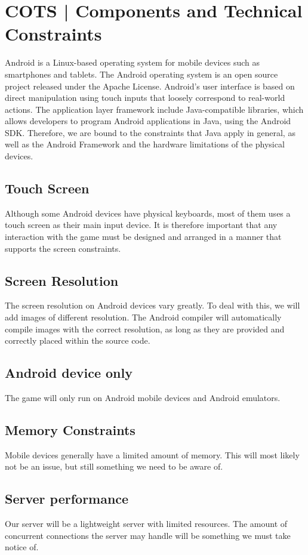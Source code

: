 \section{COTS | Components and Technical Constraints}
\label{sec:COTS}
Android is a Linux-based operating system for mobile devices such as
smartphones and tablets. The Android operating system is an open source project released under the Apache License. Android's user interface is based on direct manipulation using touch inputs that loosely correspond to real-world actions. The application layer framework include
Java-compatible libraries, which allows developers to program Android
applications in Java, using the Android SDK\@. Therefore, we are bound to the
constraints that Java apply in general, as well as the Android Framework and
the hardware limitations of the physical devices. 

\subsection{Touch Screen}
Although some Android devices have physical keyboards, most of them uses a
touch screen as their main input device. It is therefore important that any
interaction with the game must be designed and arranged in a manner that
supports the screen constraints. 

\subsection{Screen Resolution}
The screen resolution on Android devices vary greatly. To deal with this, we
will add images of different resolution. The Android compiler will
automatically compile images with the correct resolution, as long as they are
provided and correctly placed within the source code.

\subsection{Android device only}
The game will only run on Android mobile devices and Android emulators.

\subsection{Memory Constraints}
Mobile devices generally have a limited amount of memory. This will most likely
not be an issue, but still something we need to be aware of.

\subsection{Server performance}
Our server will be a lightweight server with limited resources. The amount of
concurrent connections the server may handle will be something we must take
notice of.
